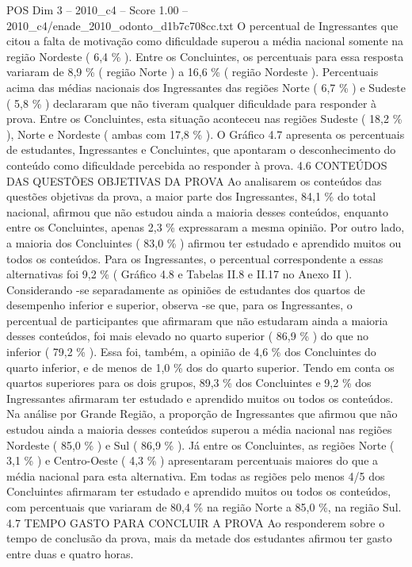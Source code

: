 \begin{textsample}{POS Dim 3 – 2010\_c4 – Score 1.00 – 2010\_c4/enade\_2010\_odonto\_d1b7c708cc.txt}
O percentual de Ingressantes que citou a falta de motivação como dificuldade superou a média nacional somente na região Nordeste ( 6,4 \% ).
Entre os Concluintes, os percentuais para essa resposta variaram de 8,9 \% ( região Norte ) a 16,6 \% ( região Nordeste ).
Percentuais acima das médias nacionais dos Ingressantes das regiões Norte ( 6,7 \% ) e Sudeste ( 5,8 \% ) declararam que não tiveram qualquer dificuldade para responder à prova.
Entre os Concluintes, esta situação aconteceu nas regiões Sudeste ( 18,2 \% ), Norte e Nordeste ( ambas com 17,8 \% ).
O Gráfico 4.7 apresenta os percentuais de estudantes, Ingressantes e Concluintes, que apontaram o desconhecimento do conteúdo como dificuldade percebida ao responder à prova. 4.6 CONTEÚDOS DAS QUESTÕES OBJETIVAS DA PROVA Ao analisarem os conteúdos das questões objetivas da prova, a maior parte dos Ingressantes, 84,1 \% do total nacional, afirmou que não estudou ainda a maioria desses conteúdos, enquanto entre os Concluintes, apenas 2,3 \% expressaram a mesma opinião.
Por outro lado, a maioria dos Concluintes ( 83,0 \% ) afirmou ter estudado e aprendido muitos ou todos os conteúdos.
Para os Ingressantes, o percentual correspondente a essas alternativas foi 9,2 \% ( Gráfico 4.8 e Tabelas II.8 e II.17 no Anexo II ).
Considerando -se separadamente as opiniões de estudantes dos quartos de desempenho inferior e superior, observa -se que, para os Ingressantes, o percentual de participantes que afirmaram que não estudaram ainda a maioria desses conteúdos, foi mais elevado no quarto superior ( 86,9 \% ) do que no inferior ( 79,2 \% ).
Essa foi, também, a opinião de 4,6 \% dos Concluintes do quarto inferior, e de menos de 1,0 \% dos do quarto superior.
Tendo em conta os quartos superiores para os dois grupos, 89,3 \% dos Concluintes e 9,2 \% dos Ingressantes afirmaram ter estudado e aprendido muitos ou todos os conteúdos.
Na análise por Grande Região, a proporção de Ingressantes que afirmou que não estudou ainda a maioria desses conteúdos superou a média nacional nas regiões Nordeste ( 85,0 \% ) e Sul ( 86,9 \% ).
Já entre os Concluintes, as regiões Norte ( 3,1 \% ) e Centro-Oeste ( 4,3 \% ) apresentaram percentuais maiores do que a média nacional para esta alternativa.
Em todas as regiões pelo menos 4/5 dos Concluintes afirmaram ter estudado e aprendido muitos ou todos os conteúdos, com percentuais que variaram de 80,4 \% na região Norte a 85,0 \%, na região Sul. 4.7 TEMPO GASTO PARA CONCLUIR A PROVA Ao responderem sobre o tempo de conclusão da prova, mais da metade dos estudantes afirmou ter gasto entre duas e quatro horas.

\end{textsample}
